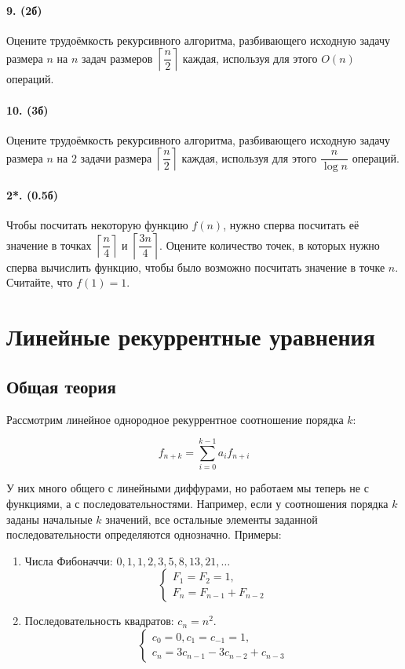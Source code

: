 \documentclass{article}
\begin{document}
\paragraph{9. (2б)} Оцените трудоёмкость рекурсивного алгоритма, разбивающего исходную задачу размера $n$ на $n$ задач размеров $\left \lceil\dfrac{n}{2} \right \rceil$ каждая, используя для этого $O(n)$ операций.

\paragraph{10. (3б)} Оцените трудоёмкость рекурсивного алгоритма, разбивающего исходную задачу размера $n$ на $2$ задачи размера $\left \lceil\dfrac{n}{2} \right \rceil$ каждая, используя для этого $\dfrac{n}{\log n}$ операций.


\paragraph{2*. (0.5б)} Чтобы посчитать некоторую функцию $f(n)$, нужно сперва посчитать её значение в точках $\left \lceil \dfrac{n}{4} \right \rceil$ и $\left\lceil \dfrac{3n}{4}\right \rceil$. Оцените количество точек, в которых нужно сперва вычислить функцию, чтобы было возможно посчитать значение в точке $n$. Считайте, что $f(1)=1$.


\section*{Линейные рекуррентные уравнения}

\subsection*{Общая теория}

Рассмотрим линейное однородное рекуррентное соотношение порядка $k$:

$$f_{n+k}=\sum\limits_{i=0}^{k-1} a_{i} f_{n+i}$$

У них много общего с линейными диффурами, но работаем мы теперь не с функциями, а с последовательностями. Например, если у соотношения порядка $k$ заданы начальные $k$ значений, все остальные элементы заданной последовательности определяются однозначно. Примеры:

\begin{enumerate}
    \item Числа Фибоначчи: $0,1,1,2,3,5,8,13,21,\dots$ $$\begin{cases}F_1=F_2=1,\\F_n = F_{n-1} + F_{n-2}\end{cases}$$
    \item Последовательность квадратов: $c_n = n^2$. $$\begin{cases}c_0=0,c_1=c_{-1}=1,\\c_n = 3c_{n-1}-3c_{n-2}+c_{n-3}\end{cases}$$
\end{enumerate}
\end{document}
